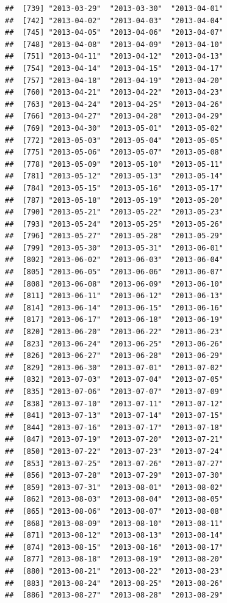 \documentclass[10pt]{article}\usepackage[]{graphicx}\usepackage[]{color}
\makeatletter
\newenvironment{kframe}{%
 \def\at@end@of@kframe{}%
 \ifinner\ifhmode%
  \def\at@end@of@kframe{\end{minipage}}%
  \begin{minipage}{\columnwidth}%
 \fi\fi%
 \def\FrameCommand##1{\hskip\@totalleftmargin \hskip-\fboxsep
 \colorbox{shadecolor}{##1}\hskip-\fboxsep
     \hskip-\linewidth \hskip-\@totalleftmargin \hskip\columnwidth}%
 \MakeFramed {\advance\hsize-\width
   \@totalleftmargin\z@ \linewidth\hsize
   \@setminipage}}%
 {\par\unskip\endMakeFramed%
 \at@end@of@kframe}
\newenvironment{knitrout}{}{} %
\theoremstyle{plain}
\makeatother
\begin{document}
\begin{knitrout}
\begin{kframe}
\begin{verbatim}
##  [739] "2013-03-29"  "2013-03-30"  "2013-04-01" 
##  [742] "2013-04-02"  "2013-04-03"  "2013-04-04" 
##  [745] "2013-04-05"  "2013-04-06"  "2013-04-07" 
##  [748] "2013-04-08"  "2013-04-09"  "2013-04-10" 
##  [751] "2013-04-11"  "2013-04-12"  "2013-04-13" 
##  [754] "2013-04-14"  "2013-04-15"  "2013-04-17" 
##  [757] "2013-04-18"  "2013-04-19"  "2013-04-20" 
##  [760] "2013-04-21"  "2013-04-22"  "2013-04-23" 
##  [763] "2013-04-24"  "2013-04-25"  "2013-04-26" 
##  [766] "2013-04-27"  "2013-04-28"  "2013-04-29" 
##  [769] "2013-04-30"  "2013-05-01"  "2013-05-02" 
##  [772] "2013-05-03"  "2013-05-04"  "2013-05-05" 
##  [775] "2013-05-06"  "2013-05-07"  "2013-05-08" 
##  [778] "2013-05-09"  "2013-05-10"  "2013-05-11" 
##  [781] "2013-05-12"  "2013-05-13"  "2013-05-14" 
##  [784] "2013-05-15"  "2013-05-16"  "2013-05-17" 
##  [787] "2013-05-18"  "2013-05-19"  "2013-05-20" 
##  [790] "2013-05-21"  "2013-05-22"  "2013-05-23" 
##  [793] "2013-05-24"  "2013-05-25"  "2013-05-26" 
##  [796] "2013-05-27"  "2013-05-28"  "2013-05-29" 
##  [799] "2013-05-30"  "2013-05-31"  "2013-06-01" 
##  [802] "2013-06-02"  "2013-06-03"  "2013-06-04" 
##  [805] "2013-06-05"  "2013-06-06"  "2013-06-07" 
##  [808] "2013-06-08"  "2013-06-09"  "2013-06-10" 
##  [811] "2013-06-11"  "2013-06-12"  "2013-06-13" 
##  [814] "2013-06-14"  "2013-06-15"  "2013-06-16" 
##  [817] "2013-06-17"  "2013-06-18"  "2013-06-19" 
##  [820] "2013-06-20"  "2013-06-22"  "2013-06-23" 
##  [823] "2013-06-24"  "2013-06-25"  "2013-06-26" 
##  [826] "2013-06-27"  "2013-06-28"  "2013-06-29" 
##  [829] "2013-06-30"  "2013-07-01"  "2013-07-02" 
##  [832] "2013-07-03"  "2013-07-04"  "2013-07-05" 
##  [835] "2013-07-06"  "2013-07-07"  "2013-07-09" 
##  [838] "2013-07-10"  "2013-07-11"  "2013-07-12" 
##  [841] "2013-07-13"  "2013-07-14"  "2013-07-15" 
##  [844] "2013-07-16"  "2013-07-17"  "2013-07-18" 
##  [847] "2013-07-19"  "2013-07-20"  "2013-07-21" 
##  [850] "2013-07-22"  "2013-07-23"  "2013-07-24" 
##  [853] "2013-07-25"  "2013-07-26"  "2013-07-27" 
##  [856] "2013-07-28"  "2013-07-29"  "2013-07-30" 
##  [859] "2013-07-31"  "2013-08-01"  "2013-08-02" 
##  [862] "2013-08-03"  "2013-08-04"  "2013-08-05" 
##  [865] "2013-08-06"  "2013-08-07"  "2013-08-08" 
##  [868] "2013-08-09"  "2013-08-10"  "2013-08-11" 
##  [871] "2013-08-12"  "2013-08-13"  "2013-08-14" 
##  [874] "2013-08-15"  "2013-08-16"  "2013-08-17" 
##  [877] "2013-08-18"  "2013-08-19"  "2013-08-20" 
##  [880] "2013-08-21"  "2013-08-22"  "2013-08-23" 
##  [883] "2013-08-24"  "2013-08-25"  "2013-08-26" 
##  [886] "2013-08-27"  "2013-08-28"  "2013-08-29" 

\end{verbatim}
\end{kframe}
\end{knitrout}
\end{document}
